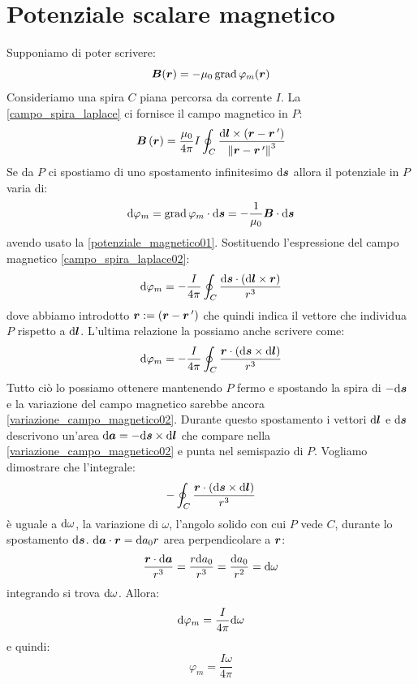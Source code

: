 \section{Potenziale scalare magnetico}
Supponiamo di poter scrivere:
\begin{equation}
  \boldsymbol{B}(\boldsymbol{r})=-\mu_0\operatorname{grad}\varphi_m(\boldsymbol{r})
  \label{potenziale_magnetico01}
\end{equation}
Consideriamo una spira $C$ piana percorsa da corrente $I$. La \eqref{campo_spira_laplace} ci fornisce il campo magnetico in $P$:
\begin{equation}
  \boldsymbol{B}\left(\boldsymbol{r}\right)=\frac{\mu_0}{4\pi}I\oint_C\frac{\mathrm{d}\boldsymbol{l}\times\left(\boldsymbol{r}-\boldsymbol{r}\,'\right)}{\left\lVert\boldsymbol{r}-\boldsymbol{r}\,'\right\rVert^3}
  \label{campo_spira_laplace02}
\end{equation}
Se da $P$ ci spostiamo di uno spostamento infinitesimo $\mathrm{d}\boldsymbol{s}$ allora il potenziale in $P$ varia di:
\begin{equation}
  \mathrm{d}\varphi_m=\operatorname{grad}\varphi_m\cdot\mathrm{d} \boldsymbol{s}=-\frac{1}{\mu_0}\boldsymbol{B}\cdot\mathrm{d} \boldsymbol{s}
\end{equation}
avendo usato la \eqref{potenziale_magnetico01}. Sostituendo l'espressione del campo magnetico \eqref{campo_spira_laplace02}:
\begin{equation}
  \mathrm{d}\varphi_m=-\frac{I}{4\pi}\oint_C\frac{\mathrm{d} \boldsymbol{s}\cdot(\mathrm{d}\boldsymbol{l}\times\boldsymbol{r})}{r^3}
\end{equation}
dove abbiamo introdotto $\boldsymbol{r}:=(\boldsymbol{r}-\boldsymbol{r}\,')$ che quindi indica il vettore che individua $P$ rispetto a $\mathrm{d}\boldsymbol{l}$. L'ultima relazione la possiamo anche scrivere come:
\begin{equation}
  \mathrm{d}\varphi_m=-\frac{I}{4\pi}\oint_C\frac{\boldsymbol{r}\cdot(\mathrm{d} \boldsymbol{s}\times\mathrm{d}\boldsymbol{l})}{r^3}
  \label{variazione_campo_magnetico02}
\end{equation}
Tutto ciò lo possiamo ottenere mantenendo $P$ fermo e spostando la spira di $-\mathrm{d}\boldsymbol{s}$ e la variazione del campo magnetico sarebbe ancora \eqref{variazione_campo_magnetico02}. Durante questo spostamento i vettori $\mathrm{d}\boldsymbol{l}$ e $\mathrm{d} \boldsymbol{s}$ descrivono un'area $\mathrm{d} \boldsymbol{a}=-\mathrm{d}\boldsymbol{s}\times\mathrm{d}\boldsymbol{l}$ che compare nella \eqref{variazione_campo_magnetico02} e punta nel semispazio di $P$. Vogliamo dimostrare che l'integrale:
\[
  -\oint_C\frac{\boldsymbol{r}\cdot(\mathrm{d} \boldsymbol{s}\times\mathrm{d}\boldsymbol{l})}{r^3}
\]
è uguale a $\mathrm{d}\omega$, la variazione di $\omega$, l'angolo solido con cui $P$ vede $C$, durante lo spostamento $\mathrm{d}\boldsymbol{s}$. $\mathrm{d} \boldsymbol{a}\cdot\boldsymbol{r}=\mathrm{d} a_0 r$ area perpendicolare a $\boldsymbol{r}$:
\[\frac{\boldsymbol{r}\cdot\mathrm{d}\boldsymbol{a}}{r^3}=\frac{r\mathrm{d} a_0}{r^3}=\frac{\mathrm{d} a_0}{r^2}=\mathrm{d}\omega\]
integrando si trova $\mathrm{d}\omega$. Allora:
\begin{equation}
  \mathrm{d}\varphi_m=\frac{I}{4\pi}\mathrm{d}\omega
\end{equation}
e quindi:
\begin{equation}
  \varphi_m=\frac{I\omega}{4\pi}
  \label{potenziale_magnetico_03}
\end{equation}

